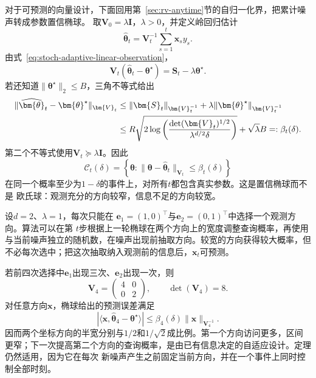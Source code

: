 对于可预测的向量设计，下面回用第~\ref{sec:rv-anytime}节的自归一化界，把累计噪声转成参数置信椭球。
取$\bm{V}_0=\lambda\bm{I}$，$\lambda>0$，并定义岭回归估计
\begin{equation}
  \widehat{\bm{\theta}}_t
  =\bm{V}_t^{-1}\sum_{s=1}^{t}\bm{x}_s y_s.
  \label{eq:stoch-ridge-estimator}
\end{equation}
由式~\eqref{eq:stoch-adaptive-linear-observation}，
\[
  \bm{V}_t
  (\widehat{\bm{\theta}}_t-\bm{\theta}^{\star})
  =
  \bm{S}_t-\lambda\bm{\theta}^{\star}.
  \]
若还知道$\lVert\bm{\theta}^{\star}\rVert_2\leq B$，三角不等式给出
\begin{align}
  \lVert
    \widehat{\bm{\theta}}_t-\bm{\theta}^{\star}
  \rVert_{\bm{V}_t}
  &\leq
  \lVert\bm{S}_t\rVert_{\bm{V}_t^{-1}}
  +
  \lambda
  \lVert\bm{\theta}^{\star}\rVert_{\bm{V}_t^{-1}}
  \notag\\
  &\leq
  R\sqrt{
    2\log\left(
      \frac{\det(\bm{V}_t)^{1/2}}
           {\lambda^{d/2}\delta}
    \right)
  }
  +\sqrt{\lambda}B
  =:\beta_t(\delta).
  \label{eq:stoch-adaptive-confidence-ellipsoid}
\end{align}
第二个不等式使用$\bm{V}_t\succeq\lambda\bm{I}$。因此
\[
  \mathcal{C}_t(\delta)
  =
  \left\{
    \bm{\theta}:
    \lVert\bm{\theta}-\widehat{\bm{\theta}}_t
    \rVert_{\bm{V}_t}
    \leq\beta_t(\delta)
  \right\}
\]
在同一个概率至少为$1-\delta$的事件上，对所有$t$都包含真实参数。这是置信椭球而不是
欧氏球：观测充分的方向较窄，信息不足的方向较宽。

\begin{example}[二维自适应查询]
  \label{ex:stoch-two-dimensional-adaptive-design}
  设$d=2$、$\lambda=1$，每次只能在
  $\bm{e}_1=(1,0)^\top$与$\bm{e}_2=(0,1)^\top$中选择一个观测方向。算法可以在第
  $t$步根据上一轮椭球在两个方向上的宽度调整查询概率，再使用与当前噪声独立的随机数，在噪声出现前抽取方向。较宽的方向获得较大概率，但不必每次选中；把这次抽取纳入观测前的信息后，$\bm{x}_t$可预测。

  若前四次选择中$\bm{e}_1$出现三次、$\bm{e}_2$出现一次，则
  \[
    \bm{V}_4
    =
    \begin{pmatrix}
      4&0\\
      0&2
    \end{pmatrix},
    \qquad
    \det(\bm{V}_4)=8.
  \]
  对任意方向$\bm{x}$，椭球给出的预测误差满足
  \[
    |\langle
      \bm{x},
      \widehat{\bm{\theta}}_4-\bm{\theta}^{\star}
    \rangle|
    \leq
    \beta_4(\delta)
    \lVert\bm{x}\rVert_{\bm{V}_4^{-1}}.
  \]
  因而两个坐标方向的半宽分别与$1/2$和$1/\sqrt2$成比例。第一个方向访问更多，区间
  更窄；下一次提高第二个方向的查询概率，是由已有信息决定的自适应设计。定理仍然适用，因为它在每次
  新噪声产生之前固定当前方向，并在一个事件上同时控制全部时刻。
\end{example}

